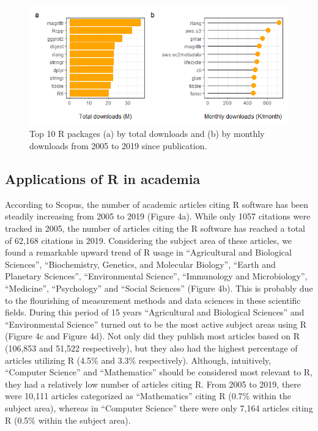 \begin{Schunk}
\begin{figure}
\includegraphics[width=1\linewidth,height=0.3\textheight]{fig3} \caption[Top 10 R packages (a) by total downloads and (b) by monthly downloads from 2005 to 2019 since publication]{Top 10 R packages (a) by total downloads and (b) by monthly downloads from 2005 to 2019 since publication. }\label{fig:fig3}
\end{figure}
\end{Schunk}

\hypertarget{applications-of-r-in-academia}{%
\subsection{Applications of R in
academia}\label{applications-of-r-in-academia}}

According to Scopus, the number of academic articles citing R software
has been steadily increasing from 2005 to 2019 (Figure 4a). While only
1057 citations were tracked in 2005, the number of articles citing the R
software has reached a total of 62,168 citations in 2019. Considering
the subject area of these articles, we found a remarkable upward trend
of R usage in ``Agricultural and Biological Sciences'', ``Biochemistry,
Genetics, and Molecular Biology'', ``Earth and Planetary Sciences'',
``Environmental Science'', ``Immunology and Microbiology'',
``Medicine'', ``Psychology'' and ``Social Sciences'' (Figure 4b). This
is probably due to the flourishing of measurement methods and data
sciences in these scientific fields. During this period of 15 years
``Agricultural and Biological Sciences'' and ``Environmental Science''
turned out to be the most active subject areas using R (Figure 4c and
Figure 4d). Not only did they publish most articles based on R (106,853
and 51,522 respectively), but they also had the highest percentage of
articles utilizing R (4.5\% and 3.3\% respectively). Although,
intuitively, ``Computer Science'' and ``Mathematics'' should be
considered most relevant to R, they had a relatively low number of
articles citing R. From 2005 to 2019, there were 10,111 articles
categorized as ``Mathematics'' citing R (0.7\% within the subject area),
whereas in ``Computer Science'' there were only 7,164 articles citing R
(0.5\% within the subject area).

